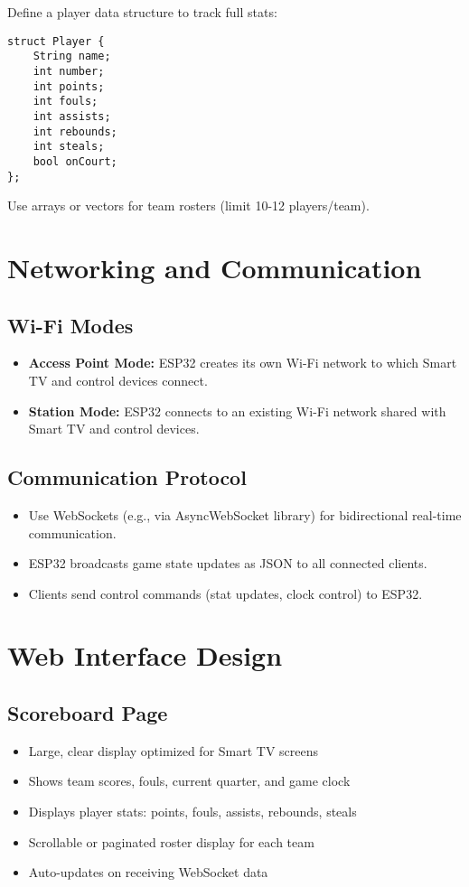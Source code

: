 \documentclass[a4paper,12pt]{article}
\begin{document}
Define a player data structure to track full stats:

\begin{verbatim}
struct Player {
    String name;
    int number;
    int points;
    int fouls;
    int assists;
    int rebounds;
    int steals;
    bool onCourt;
};
\end{verbatim}

Use arrays or vectors for team rosters (limit 10-12 players/team).

\section{Networking and Communication}

\subsection{Wi-Fi Modes}
\begin{itemize}[noitemsep]
    \item \textbf{Access Point Mode:} ESP32 creates its own Wi-Fi network to which Smart TV and control devices connect.
    \item \textbf{Station Mode:} ESP32 connects to an existing Wi-Fi network shared with Smart TV and control devices.
\end{itemize}

\subsection{Communication Protocol}
\begin{itemize}[noitemsep]
    \item Use WebSockets (e.g., via AsyncWebSocket library) for bidirectional real-time communication.
    \item ESP32 broadcasts game state updates as JSON to all connected clients.
    \item Clients send control commands (stat updates, clock control) to ESP32.
\end{itemize}

\section{Web Interface Design}

\subsection{Scoreboard Page}
\begin{itemize}[noitemsep]
    \item Large, clear display optimized for Smart TV screens
    \item Shows team scores, fouls, current quarter, and game clock
    \item Displays player stats: points, fouls, assists, rebounds, steals
    \item Scrollable or paginated roster display for each team
    \item Auto-updates on receiving WebSocket data
\end{itemize}
\end{document}

